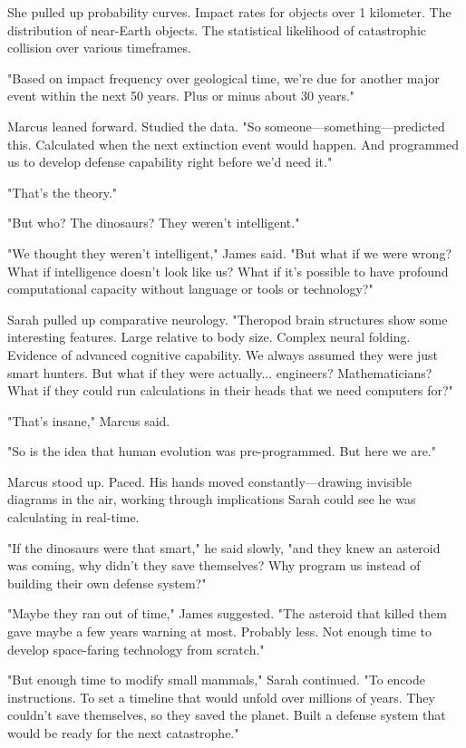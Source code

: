She pulled up probability curves. Impact rates for objects over 1 kilometer. The distribution of near-Earth objects. The statistical likelihood of catastrophic collision over various timeframes.

"Based on impact frequency over geological time, we're due for another major event within the next 50 years. Plus or minus about 30 years."

Marcus leaned forward. Studied the data. "So someone—something—predicted this. Calculated when the next extinction event would happen. And programmed us to develop defense capability right before we'd need it."

"That's the theory."

"But who? The dinosaurs? They weren't intelligent."

"We thought they weren't intelligent," James said. "But what if we were wrong? What if intelligence doesn't look like us? What if it's possible to have profound computational capacity without language or tools or technology?"

Sarah pulled up comparative neurology. "Theropod brain structures show some interesting features. Large relative to body size. Complex neural folding. Evidence of advanced cognitive capability. We always assumed they were just smart hunters. But what if they were actually... engineers? Mathematicians? What if they could run calculations in their heads that we need computers for?"

"That's insane," Marcus said.

"So is the idea that human evolution was pre-programmed. But here we are."

Marcus stood up. Paced. His hands moved constantly—drawing invisible diagrams in the air, working through implications Sarah could see he was calculating in real-time.

"If the dinosaurs were that smart," he said slowly, "and they knew an asteroid was coming, why didn't they save themselves? Why program us instead of building their own defense system?"

"Maybe they ran out of time," James suggested. "The asteroid that killed them gave maybe a few years warning at most. Probably less. Not enough time to develop space-faring technology from scratch."

"But enough time to modify small mammals," Sarah continued. "To encode instructions. To set a timeline that would unfold over millions of years. They couldn't save themselves, so they saved the planet. Built a defense system that would be ready for the next catastrophe."


